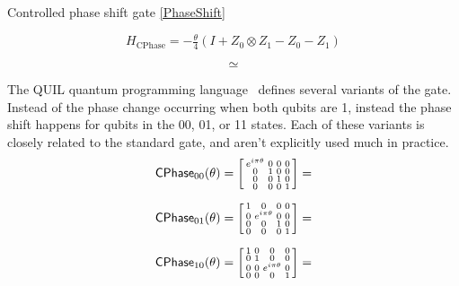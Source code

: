 Controlled phase shift gate \eqref{PhaseShift}

\[
H_{\text{CPhase}} = - \tfrac{\theta}{4} (I + Z_0\otimes Z_1 - Z_0 - Z_1)
\]

$$ \simeq $$

The QUIL quantum programming language~\cite{Smith2016a, ???} defines several variants of the  gate. Instead of the phase change occurring  when both qubits are 1, instead the phase shift happens for qubits in the 00, 01, or 11 states. Each of these variants is closely related to the standard  gate, and aren't explicitly used much in practice. 
$$
{\sf{CPhase}}_{00}(\theta) = 
\begin{bsmallmatrix}
 e^{i \pi \theta} & 0 & 0 & 0 \\
  0 & 1  & 0  & 0 \\
  0 & 0  & 1 & 0 \\
 0  & 0 & 0 &  1
\end{bsmallmatrix}
= 
$$

$$
{\sf{CPhase}}_{01}(\theta) = 
\begin{bsmallmatrix}
 1 & 0 & 0 & 0 \\
  0 & e^{i \pi \theta}  & 0  & 0 \\
  0 & 0  & 1 & 0 \\
 0  & 0 & 0 & 1
\end{bsmallmatrix}
= 
$$


$$
{\sf{CPhase}}_{10}(\theta) = 
\begin{bsmallmatrix}
 1 & 0 & 0 & 0 \\
  0 & 1  & 0  & 0 \\
  0 & 0  & e^{i \pi \theta} & 0 \\
 0  & 0 & 0 & 1
\end{bsmallmatrix}
= 
$$



